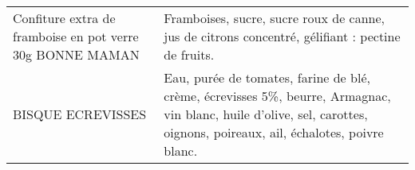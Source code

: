 \begin{longtable}{p{5cm}p{10cm}}
                                                Confiture extra de framboise en pot verre 30g BONNE MAMAN &                                                                                                                                                                                                                                                                                                                                                                                                                                                                                                                                                                                                                                                                                                                                                                                                                                                                                                                                         Framboises, sucre, sucre roux de canne, jus de citrons concentré, gélifiant : pectine de fruits. \\
                                                                                       BISQUE ECREVISSES  &                                                                                                                                                                                                                                                                                                                                                                                                                                                                                                                                                                                                                                                                                                                                                                                                                                                                  Eau, purée de tomates, farine de blé, crème, écrevisses 5\%, beurre, Armagnac, vin blanc, huile d'olive, sel, carottes, oignons, poireaux, ail, échalotes, poivre blanc. \\

\end{longtable}
